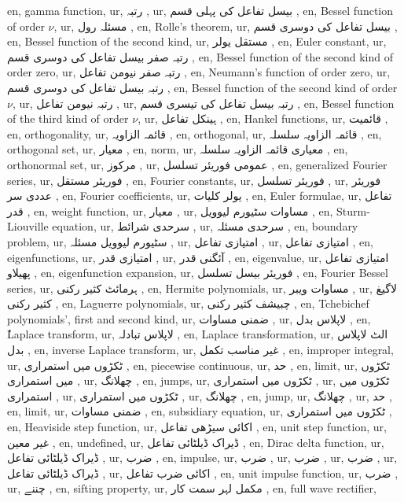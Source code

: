 en, gamma function,
ur, رتبہ ,
ur, بیسل تفاعل کی پہلی قسم ,
en, Bessel function of order $\nu $,
ur, مسئلہ رول ,
en, Rolle's theorem,
ur, بیسل تفاعل کی دوسری قسم ,
en, Bessel function of the second kind,
ur, مستقل یولر ,
en, Euler constant,
ur, رتبہ صفر بیسل تفاعل کی دوسری قسم ,
en, Bessel function of the second kind of order zero,
ur, رتبہ صفر نیومن تفاعل ,
en, Neumann's function of order zero,
ur, رتبہ  بیسل تفاعل کی دوسری قسم ,
en, Bessel function of the second kind of order $\nu $,
ur, رتبہ  نیومن تفاعل ,
ur, رتبہ  بیسل تفاعل کی تیسری قسم ,
en, Bessel function of the third kind of order $\nu $,
ur, ہینکل تفاعل ,
en, Hankel functions,
ur, قائمیت ,
en, orthogonality,
ur, قائمہ الزاویہ ,
en, orthogonal,
ur, قائمہ الزاویہ سلسلہ ,
en, orthogonal set,
ur, معیار ,
en, norm,
ur, معیاری قائمہ الزاویہ سلسلہ ,
en, orthonormal set,
ur, مرکوز ,
ur, عمومی فوریئر تسلسل ,
en, generalized Fourier series,
ur, فوریئر مستقل ,
en, Fourier constants,
ur, فوریئر تسلسل ,
ur, فوریئر عددی سر ,
en, Fourier coefficients,
ur, یولر کلیات ,
en, Euler formulae,
ur, تفاعل قدر ,
en, weight function,
ur, معیار ,
ur, مساوات سٹیورم لیوویل ,
en, Sturm-Liouville equation,
ur, سرحدی شرائط ,
ur, سرحدی مسئلہ ,
en, boundary problem,
ur, سٹیورم لیوویل مسئلہ ,
ur, امتیازی تفاعل ,
ur, امتیازی تفاعل ,
en, eigenfunctions,
ur, امتیازی قدر ,
ur, آئگنی قدر ,
en, eigenvalue,
ur, امتیازی تفاعل پھیلاو ,
en, eigenfunction expansion,
ur, فوریئر بیسل تسلسل ,
en, Fourier Bessel series,
ur, ہرمائٹ کثیر رکنی ,
en, Hermite polynomials,
ur, مساوات ویبر ,
ur, لاگیغ کثیر رکنی ,
en, Laguerre polynomials,
ur, چبیشف کثیر رکنی ,
en, Tchebichef polynomials', first and second kind,
ur, ضمنی مساوات ,
ur, لاپلاس بدل ,
en, ٔLaplace transform,
ur, لاپلاس تبادلہ ,
en, Laplace transformation,
ur, الٹ لاپلاس بدل ,
en, inverse Laplace transform,
ur, غیر مناسب تکمل ,
en, improper integral,
ur, ٹکڑوں میں استمراری ,
en, piecewise continuous,
ur, حد ,
en, limit,
ur, ٹکڑوں میں استمراری ,
ur, چھلانگ ,
en, jumps,
ur, ٹکڑوں میں استمراری ,
ur, ٹکڑوں میں استمراری ,
ur, ٹکڑوں میں استمراری ,
ur, چھلانگ ,
en, jump,
ur, چھلانگ ,
ur, حد ,
en, limit,
ur, ضمنی مساوات ,
en, subsidiary equation,
ur, ٹکڑوں میں استمراری ,
en, Heaviside step function,
ur, اکائی سیڑھی تفاعل ,
en, unit step function,
ur, غیر معین ,
en, undefined,
ur, ڈیراک ڈیلٹائی تفاعل ,
en, Dirac delta function,
ur, ڈیراک ڈیلٹائی تفاعل ,
ur, ضرب ,
en, impulse,
ur, ضرب ,
ur, ضرب ,
ur, ضرب ,
ur, ڈیراک ڈیلٹائی تفاعل ,
ur, اکائی ضرب تفاعل ,
en, unit impulse function,
ur, ضرب ,
ur, چننے ,
en, sifting property,
ur, مکمل لہر سمت کار ,
en, full wave rectifier,
